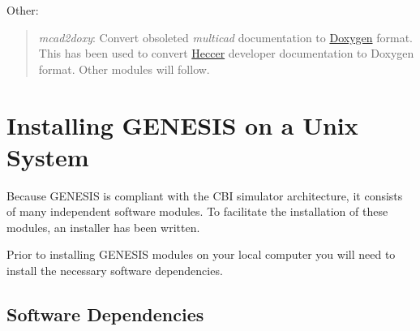 \documentclass[12pt]{article}
\begin{document}
Other:
\begin{quote}
\item {\it mcad2doxy}: Convert obsoleted {\it multicad} documentation to \href{http://www.stack.nl/~dimitri/doxygen/}{Doxygen} format. This has been used to convert \href{../heccer/heccer.pdf}{Heccer} developer documentation to Doxygen format. Other modules will follow. 
\end{quote}

\section*{Installing GENESIS on a Unix System}

Because GENESIS is compliant with the CBI simulator architecture, it consists of many independent software modules. To facilitate the installation of these modules, an installer has been written.

Prior to installing GENESIS modules on your local computer you will need to install the necessary software dependencies.

\subsection*{Software Dependencies}
\end{document}
